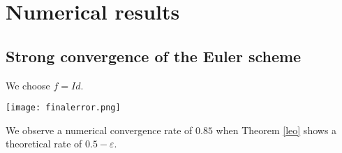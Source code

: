 \documentclass[12pt]{article}
\begin{document}
\newpage
\section{Numerical results}
    \subsection{Strong convergence of the Euler scheme}
    We choose $f=Id$.
    
        \begin{center}
            \texttt{[image: finalerror.png]}
        \end{center}
    
    We observe a numerical convergence rate of $0.85$ when Theorem \ref{leo} shows a theoretical rate of $0.5-\varepsilon$.
 


    
\end{document}
